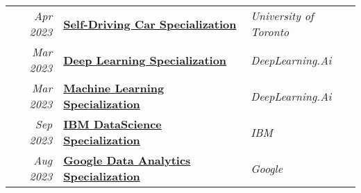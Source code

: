 \documentclass[letterpaper]{deedy-resume} %
\begin{document}
\begin{minipage}[t]{0.66\textwidth}
\begin{tabular}{rll}
\textit{Apr 2023} & \href{https://drive.google.com/file/d/1Ie8h6SQCB01rqpMTPAhcZeSxWbhWZ_kK/view?usp=sharing}{\textbf{Self-Driving Car Specialization}} & \textit{University of Toronto} \\
\textit{Mar 2023} & \href{https://drive.google.com/file/d/1ntkqytBIRZEXqgHdYQNZMGp1nE3WO55d/view?usp=sharing}{\textbf{Deep Learning Specialization}} & \textit{DeepLearning.Ai}\\
\textit{Mar 2023} & \href{https://drive.google.com/file/d/1YZUAKlISMpajxgVp9BG4QAlyjjT0asmS/view?usp=sharing}{\textbf{Machine Learning Specialization}} & \textit{DeepLearning.Ai}\\
\textit{Sep 2023} & \href{https://drive.google.com/file/d/1SjB08sBkOdnVYhFSPnfVwaZvxJDHKTAR/view?usp=sharing}{\textbf{IBM DataScience Specialization}} & \textit{IBM} \\
\textit{Aug 2023} & \href{https://drive.google.com/file/d/190uxeWvmM_IX0r2WzYTZ6nSd4hX1L9VZ/view?usp=sharing}{\textbf{Google Data Analytics Specialization}} & \textit{Google} \\
\end{tabular}

\sectionspace %


\end{minipage} %








\end{document}
